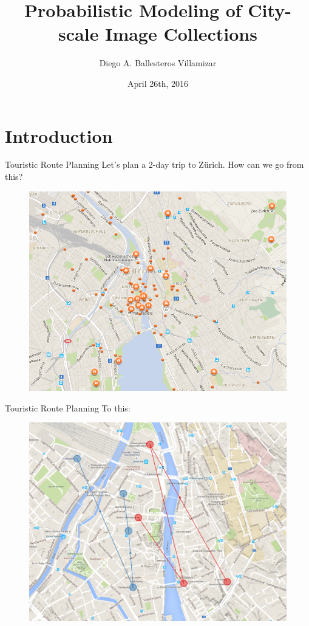 \documentclass{beamer}
\title[M.Sc. Thesis 2015]{Probabilistic Modeling of City-scale Image Collections}
\author{Diego A. Ballesteros Villamizar}
\institute[ETHZ]{ETH Zürich}
\date{April 26th, 2016}
\begin{document}
\begin{frame}
  \titlepage
\end{frame}

\section{Introduction}

\begin{frame}{Touristic Route Planning}
  Let's plan a 2-day trip to Zürich. How can we go from this?
  \begin{figure}
    \centering
    \includegraphics[scale=0.3]{tripadvisor}
  \end{figure}
\end{frame}

\begin{frame}{Touristic Route Planning}
  To this:
  \begin{figure}
    \centering
    \includegraphics[scale=0.2]{routes_1}
  \end{figure}
\end{frame}
\end{document}
